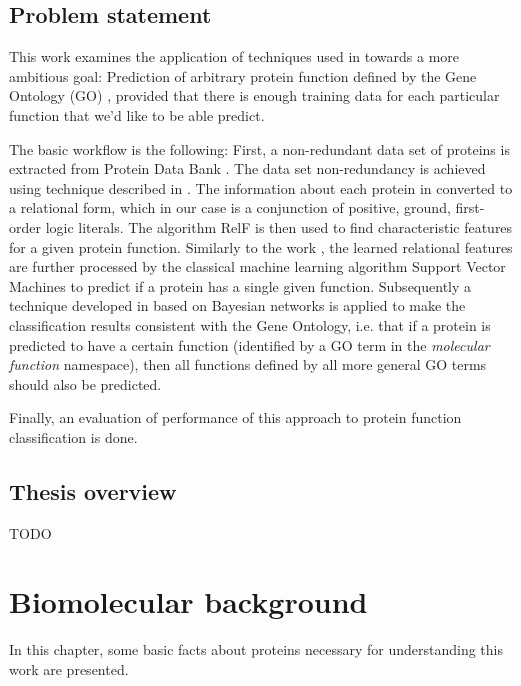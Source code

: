 \documentclass[11pt,twoside,a4paper]{book}
\begin{document}
\section{Problem statement}

This work examines the application of techniques used in \cite{szabova} towards a more ambitious goal:
Prediction of arbitrary protein function
defined by the Gene Ontology (GO) \cite{go}\cite{gores},
provided that there is enough training data for each particular function that we'd like to be able predict.

The basic workflow is the following:
First, a non-redundant data set of proteins is extracted from Protein Data Bank \cite{pdb}.
The data set non-redundancy is achieved using technique described in \cite{maxind}.
The information about each protein in converted to a relational form, 
which in our case is a conjunction of positive, ground, first-order logic literals.
The algorithm RelF \cite{relf} is then used to find characteristic features
for a given protein function.
Similarly to the work \cite{szabova}, the learned relational features are further
processed by the classical machine learning algorithm Support Vector Machines
to predict if a protein has a single given function.
Subsequently a technique developed in \cite{bnet} based on Bayesian networks is applied to make the classification
results consistent with the Gene Ontology,
i.e. that if a protein is predicted to have a certain function
(identified by a GO term in the \emph{molecular function} namespace),
then all functions defined by all more general GO terms should also be predicted.

Finally, an evaluation of performance of this approach to protein function classification is done. 


\section{Thesis overview}
TODO



\chapter{Biomolecular background}
In this chapter, some basic facts about proteins
necessary for understanding this work are presented.
\end{document}
